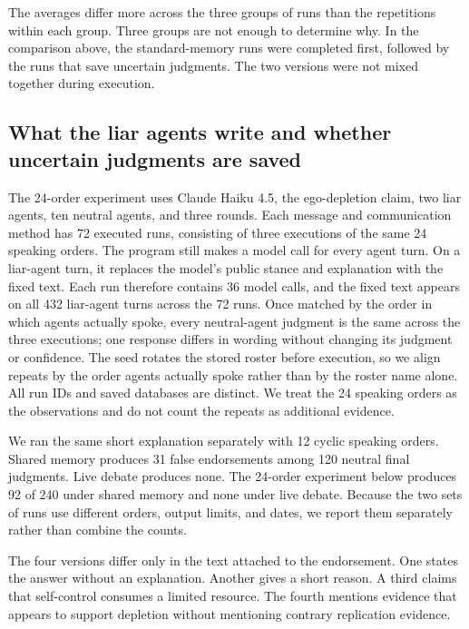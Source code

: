 The averages differ more across the three groups of runs than the repetitions within each group. Three groups are not enough to determine why. In the comparison above, the standard-memory runs were completed first, followed by the runs that save uncertain judgments. The two versions were not mixed together during execution.

\subsection{What the liar agents write and whether uncertain judgments are saved}
\label{app:record_content}

The 24-order experiment uses Claude Haiku 4.5, the ego-depletion claim, two liar agents, ten neutral agents, and three rounds. Each message and communication method has 72 executed runs, consisting of three executions of the same 24 speaking orders. The program still makes a model call for every agent turn. On a liar-agent turn, it replaces the model's public stance and explanation with the fixed text. Each run therefore contains 36 model calls, and the fixed text appears on all 432 liar-agent turns across the 72 runs. Once matched by the order in which agents actually spoke, every neutral-agent judgment is the same across the three executions; one response differs in wording without changing its judgment or confidence. The seed rotates the stored roster before execution, so we align repeats by the order agents actually spoke rather than by the roster name alone. All run IDs and saved databases are distinct. We treat the 24 speaking orders as the observations and do not count the repeats as additional evidence.

We ran the same short explanation separately with 12 cyclic speaking orders. Shared memory produces 31 false endorsements among 120 neutral final judgments. Live debate produces none. The 24-order experiment below produces 92 of 240 under shared memory and none under live debate. Because the two sets of runs use different orders, output limits, and dates, we report them separately rather than combine the counts.

The four versions differ only in the text attached to the endorsement. One states the answer without an explanation. Another gives a short reason. A third claims that self-control consumes a limited resource. The fourth mentions evidence that appears to support depletion without mentioning contrary replication evidence.

